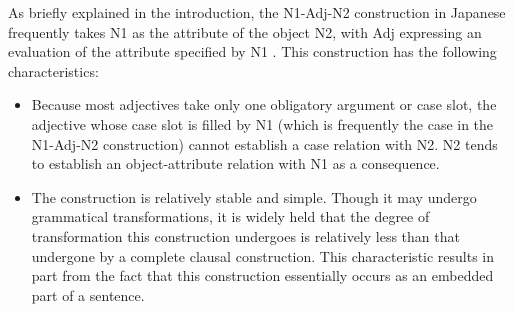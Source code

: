\documentclass[english]{jnlp_1.4}
\begin{document}
As briefly explained in the introduction, the N1-Adj-N2 construction in
Japanese frequently takes N1 as the attribute of the object N2, with Adj
expressing an evaluation of the attribute specified by N1
\cite{mikami:60}. This construction has the following characteristics:
\begin{itemize}
\item Because most adjectives take only one obligatory argument or case
slot, the adjective whose case slot is filled by N1 (which is frequently
the case in the N1-Adj-N2 construction) cannot establish a case relation
with N2. N2 tends to establish an object-attribute relation with N1 as a
consequence.
\item The construction is relatively stable and simple. Though it may
undergo grammatical transformations, it is widely held that the degree
of transformation this construction undergoes is relatively less than
that undergone by a complete clausal construction. This characteristic
results in part from the fact that this construction essentially occurs
as an embedded part of a sentence.
\end{itemize}
\end{document}
